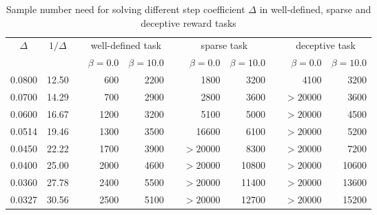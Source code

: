 \begin{table}[!htb]
    \centering
    \begin{tabular}{ccrrrrrrrrr}
    \toprule
    \multirow{2}{*}{$\Delta$} & \multirow{2}{*}{$1/\Delta$} &  & \multicolumn{2}{c}{well-defined task} &  & \multicolumn{2}{c}{sparse task} &  & \multicolumn{2}{c}{deceptive task} \\ \cline{4-5} \cline{7-8} \cline{10-11} 
                       &                      &  & $\beta=0.0$          & $\beta=10.0$         &  & $\beta=0.0$                 & $\beta=10.0$  &  & $\beta=0.0$           & $\beta=10.0$           \\ \hline
    0.0800             & 12.50                &  & 600            & 2200           &  & 1800                  & 3200    &  & 4100            & 3200             \\
    0.0700             & 14.29                &  & 700            & 2900           &  & 2800                  & 3600    &  & $>20000$           & 3600             \\
    0.0600             & 16.67                &  & 1200           & 3200           &  & 5100                  & 5000    &  & $>20000$           & 4500             \\
    0.0514             & 19.46                &  & 1300           & 3500           &  & 16600                 & 6100    &  & $>20000$           & 5200             \\
    0.0450             & 22.22                &  & 1700           & 3900           &  & $>20000$   & 8300    &  & $>20000$           & 7200             \\
    0.0400             & 25.00                &  & 2000           & 4600           &  & $>20000$   & 10800   &  & $>20000$           & 10600            \\
    0.0360             & 27.78                &  & 2400           & 5500           &  & $>20000$   & 11400   &  & $>20000$           & 13600            \\
    0.0327             & 30.56                &  & 2500           & 5100           &  & $>20000$   & 12700   &  & $>20000$           & 15200            \\ \bottomrule
    \end{tabular}
    \caption{Sample number need for solving different step coefficient $\Delta$ in well-defined, sparse and deceptive reward tasks }
    \label{tab:sample-number}
    \end{table}

